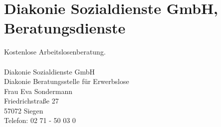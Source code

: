 \section{Diakonie Sozialdienste GmbH, Beratungsdienste}
Kostenlose Arbeitslosenberatung.\\
\\
Diakonie Sozialdienste GmbH\\
Diakonie  Beratungsstelle für Erwerbslose\\
Frau Eva Sondermann \\
Friedrichstraße 27\\
57072 Siegen \\
Telefon: 02 71 - 50 03 0 